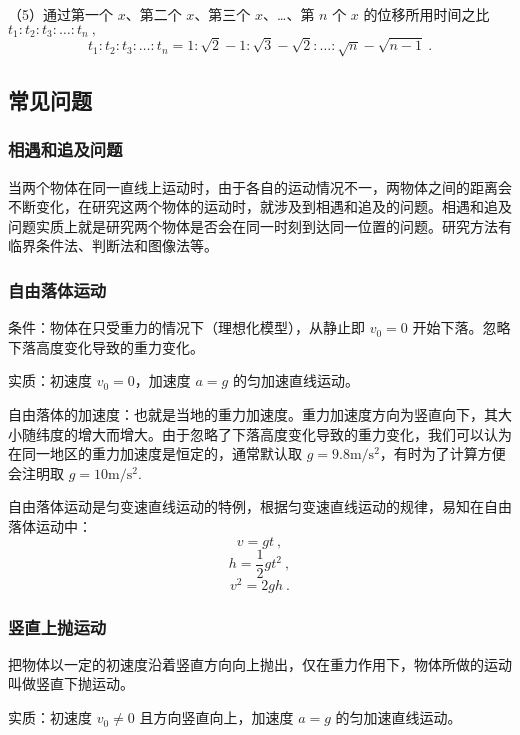 （5）通过第一个 $x$、第二个 $x$、第三个 $x$、…、第 $n$ 个 $x$ 的位移所用时间之比 $t_1:t_2:t_3:\dots:t_n~,$
\begin{equation}
t_1:t_2:t_3:\dots:t_n=1:\sqrt{2}-1:\sqrt{3}-\sqrt{2}:\dots:\sqrt{n}-\sqrt{n-1}~.
\end{equation}

\subsection{常见问题}
\subsubsection{相遇和追及问题}
当两个物体在同一直线上运动时，由于各自的运动情况不一，两物体之间的距离会不断变化，在研究这两个物体的运动时，就涉及到相遇和追及的问题。相遇和追及问题实质上就是研究两个物体是否会在同一时刻到达同一位置的问题。研究方法有临界条件法、判断法和图像法等。

\subsubsection{自由落体运动}
条件：物体在只受重力的情况下（理想化模型），从静止即 $v_0=0$ 开始下落。忽略下落高度变化导致的重力变化。

实质：初速度 $v_0=0$，加速度 $a=g$ 的匀加速直线运动。

自由落体的加速度：也就是当地的重力加速度。重力加速度方向为竖直向下，其大小随纬度的增大而增大。由于忽略了下落高度变化导致的重力变化，我们可以认为在同一地区的重力加速度是恒定的，通常默认取 $g=9.8\mathrm{m/s^2}$，有时为了计算方便会注明取 $g=10\mathrm{m/s^2}$.

自由落体运动是匀变速直线运动的特例，根据匀变速直线运动的规律，易知在自由落体运动中：
\begin{equation}
v=gt~,
\end{equation}
\begin{equation}
h=\frac12gt^2~,
\end{equation}
\begin{equation}
v^2=2gh~.
\end{equation}

\subsubsection{竖直上抛运动}
把物体以一定的初速度沿着竖直方向向上抛出，仅在重力作用下，物体所做的运动叫做竖直下抛运动。

实质：初速度 $v_0\neq0$ 且方向竖直向上，加速度 $a=g$ 的匀加速直线运动。


